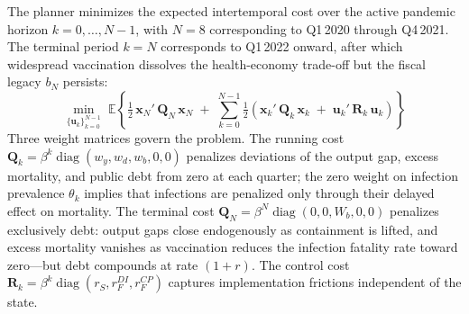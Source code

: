 \documentclass[12pt, a4paper]{article}
\begin{document}
The planner minimizes the expected intertemporal cost over the active pandemic horizon $k = 0, \ldots, N-1$, with $N = 8$ corresponding to Q1\,2020 through Q4\,2021. The terminal period $k = N$ corresponds to Q1\,2022 onward, after which widespread vaccination dissolves the health-economy trade-off but the fiscal legacy $b_N$ persists:
%
\begin{equation}
    \min_{\{\mathbf{u}_k\}_{k=0}^{N-1}} \; \mathbb{E}\left\{\tfrac{1}{2}\,\bm{x}_N'\,\bm{Q}_N\,\bm{x}_N
    \;+\; \sum_{k=0}^{N-1}\tfrac{1}{2}\left(\bm{x}_k'\,\bm{Q}_k\,\bm{x}_k
    \;+\; \bm{u}_k'\,\bm{R}_k\,\bm{u}_k\right)\right\}
    \label{eq:objective1}
\end{equation}
%
Three weight matrices govern the problem. The running cost $\bm{Q}_k = \beta^k \operatorname{diag}(w_y, w_d, w_b, 0, 0)$ penalizes deviations of the output gap, excess mortality, and public debt from zero at each quarter; the zero weight on infection prevalence $\theta_k$ implies that infections are penalized only through their delayed effect on mortality. The terminal cost $\bm{Q}_N = \beta^N \operatorname{diag}(0, 0, W_b, 0, 0)$ penalizes exclusively debt: output gaps close endogenously as containment is lifted, and excess mortality vanishes as vaccination reduces the infection fatality rate toward zero---but debt compounds at rate $(1+r)$. The control cost $\bm{R}_k = \beta^k \operatorname{diag}(r_S, r_F^{DI}, r_F^{CP})$ captures implementation frictions independent of the state.
\end{document}
